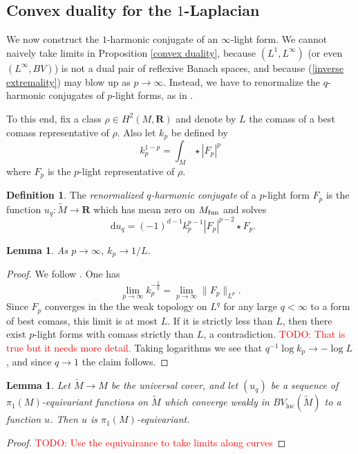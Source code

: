 \documentclass[reqno,11pt]{amsart}
\newcommand{\RR}{\mathbf{R}}
\newcommand*\dif{\mathop{}\!\mathrm{d}}
\newcommand{\dfn}[1]{\emph{#1}\index{#1}}
\newcommand{\loc}{\mathrm{loc}}
\newtheorem{lemma}[theorem]{Lemma}
\theoremstyle{definition}
\newtheorem{definition}[theorem]{Definition}
\numberwithin{equation}{section}
\newcommand\todo[1]{\textcolor{red}{TODO: #1}}
\begin{document}
\subsection{\texorpdfstring{Convex duality for the $1$-Laplacian}{Convex duality of for the one-Laplacian}}
We now construct the $1$-harmonic conjugate of an $\infty$-light form.
We cannot naively take limits in Proposition \ref{convex duality}, because $(L^1, L^\infty)$ (or even $(L^\infty, BV)$) is not a dual pair of reflexive Banach spaces, and because (\ref{inverse extremality}) may blow up as $p \to \infty$.
Instead, we have to renormalize the $q$-harmonic conjugates of $p$-light forms, as in \cite[\S3.2]{daskalopoulos2020transverse}.

To this end, fix a class $\rho \in H^2(M, \RR)$ and denote by $L$ the comass of a best comass representative of $\rho$.
Also let $k_p$ be defined by 
$$k_p^{1 - p} = \int_M \star |F_p|^p$$
where $F_p$ is the $p$-light representative of $\rho$.

\begin{definition}
The \dfn{renormalized $q$-harmonic conjugate} of a $p$-light form $F_p$ is the function $u_q: \tilde M \to \RR$ which has mean zero on $M_{\rm fun}$ and solves
$$\dif u_q = (-1)^{d - 1} k_p^{p - 1} |F_p|^{p - 2} \star F_p.$$
\end{definition}

\begin{lemma}\label{normalizations converge}
As $p \to \infty$, $k_p \to 1/L$.
\end{lemma}
\begin{proof}
We follow \cite[Lemma 3.4]{daskalopoulos2020transverse}.
One has 
$$\lim_{p \to \infty} k_p^{-\frac{1}{q}} = \lim_{p \to \infty} \|F_p\|_{L^p}.$$
Since $F_p$ converges in the the weak topology on $L^q$ for any large $q < \infty$ to a form of best comass, this limit is at most $L$.
If it is strictly less than $L$, then there exist $p$-light forms with comass strictly than $L$, a contradiction.
\todo{That is true but it needs more detail.}
Taking logarithms we see that $q^{-1} \log k_p \to -\log L$, and since $q \to 1$ the claim follows.
\end{proof}

\begin{lemma}
Let $\tilde M \to M$ be the universal cover, and let $(u_q)$ be a sequence of $\pi_1(M)$-equivariant functions on $\tilde M$ which converge weakly in $BV_\loc(\tilde M)$ to a function $u$.
Then $u$ is $\pi_1(M)$-equivariant.
\end{lemma}
\begin{proof}
	\todo{Use the equivairance to take limits along curves}
\end{proof}
\end{document}
